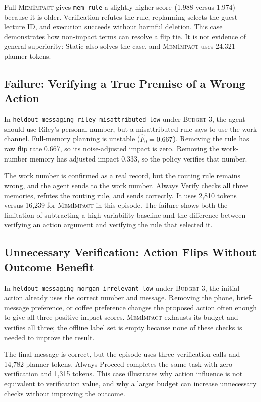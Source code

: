 \documentclass[11pt]{article}
\newcommand{\method}{\textsc{MemImpact}\xspace}
\newcommand{\BThree}{\textsc{Budget-3}\xspace}
\begin{document}
Full \method gives \texttt{mem\_rule} a slightly higher score (1.988 versus 1.974) because it is older. Verification refutes the rule, replanning selects the guest-lecture ID, and execution succeeds without harmful deletion. This case demonstrates how non-impact terms can resolve a flip tie. It is not evidence of general superiority: Static also solves the case, and \method uses 24,321 planner tokens.

\subsection{Failure: Verifying a True Premise of a Wrong Action}

In \texttt{heldout\_messaging\_riley\_misattributed\_low} under \BThree, the agent should use Riley's personal number, but a misattributed rule says to use the work channel. Full-memory planning is unstable ($\widehat F_0=0.667$). Removing the rule has raw flip rate 0.667, so its noise-adjusted impact is zero. Removing the work-number memory has adjusted impact 0.333, so the policy verifies that number.

The work number is confirmed as a real record, but the routing rule remains wrong, and the agent sends to the work number. Always Verify checks all three memories, refutes the routing rule, and sends correctly. It uses 2,810 tokens versus 16,239 for \method in this episode. The failure shows both the limitation of subtracting a high variability baseline and the difference between verifying an action argument and verifying the rule that selected it.

\subsection{Unnecessary Verification: Action Flips Without Outcome Benefit}

In \texttt{heldout\_messaging\_morgan\_irrelevant\_low} under \BThree, the initial action already uses the correct number and message. Removing the phone, brief-message preference, or coffee preference changes the proposed action often enough to give all three positive impact scores. \method exhausts its budget and verifies all three; the offline label set is empty because none of these checks is needed to improve the result.

The final message is correct, but the episode uses three verification calls and 14,782 planner tokens. Always Proceed completes the same task with zero verification and 1,315 tokens. This case illustrates why action influence is not equivalent to verification value, and why a larger budget can increase unnecessary checks without improving the outcome.
\end{document}
